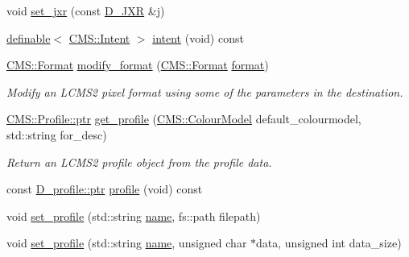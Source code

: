 \begin{DoxyCompactItemize}
\item 
void \hyperlink{class_photo_finish_1_1_destination_ad57708cb2aee97eb32f82825c5427e40}{set\+\_\+jxr} (const \hyperlink{class_photo_finish_1_1_d___j_x_r}{D\+\_\+\+J\+XR} \&j)
\item 
\hyperlink{class_photo_finish_1_1definable}{definable}$<$ \hyperlink{namespace_c_m_s_aabe6afbe3c2cd6188befc3096f1ea069}{C\+M\+S\+::\+Intent} $>$ \hyperlink{class_photo_finish_1_1_destination_a034dceb77f7bf63edb1749da8ac88bcf}{intent} (void) const
\item 
\hyperlink{class_c_m_s_1_1_format}{C\+M\+S\+::\+Format} \hyperlink{class_photo_finish_1_1_destination_a374870bcd20dc05ec7dec1e1f2cfb4cc}{modify\+\_\+format} (\hyperlink{class_c_m_s_1_1_format}{C\+M\+S\+::\+Format} \hyperlink{class_photo_finish_1_1_destination_ac3e539fafa18892508dfb98cf68f29db}{format})
\begin{DoxyCompactList}\small\item\em Modify an L\+C\+M\+S2 pixel format using some of the parameters in the destination. \end{DoxyCompactList}\item 
\hyperlink{class_c_m_s_1_1_profile_a7d5a80e1317d17dbfdf5ae69820ab08b}{C\+M\+S\+::\+Profile\+::ptr} \hyperlink{class_photo_finish_1_1_destination_ae55bd5f0875ee3c7ce0bba1e5eb115b2}{get\+\_\+profile} (\hyperlink{namespace_c_m_s_a9cb18b5da51a22c3c9dd25a5c9048e42}{C\+M\+S\+::\+Colour\+Model} default\+\_\+colourmodel, std\+::string for\+\_\+desc)
\begin{DoxyCompactList}\small\item\em Return an L\+C\+M\+S2 profile object from the profile data. \end{DoxyCompactList}\item 
const \hyperlink{class_photo_finish_1_1_d__profile_a9711c3571babd1b40709747a63866b38}{D\+\_\+profile\+::ptr} \hyperlink{class_photo_finish_1_1_destination_ae5ad7d46d7f7229fd58ac727afc25aad}{profile} (void) const
\item 
void \hyperlink{class_photo_finish_1_1_destination_aa49fdb6a14357035eaefa7d37134a173}{set\+\_\+profile} (std\+::string \hyperlink{class_photo_finish_1_1_destination_a96d21769385305f7b9168b43ba562019}{name}, fs\+::path filepath)
\item 
void \hyperlink{class_photo_finish_1_1_destination_a05f4da975f2b1bc18eece0e50c01d45f}{set\+\_\+profile} (std\+::string \hyperlink{class_photo_finish_1_1_destination_a96d21769385305f7b9168b43ba562019}{name}, unsigned char $\ast$data, unsigned int data\+\_\+size)

\end{DoxyCompactItemize}
